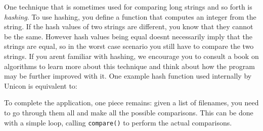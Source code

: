 
One technique that is sometimes used for comparing long strings and so
forth is \textit{hashing}. To use hashing, you define a
function that computes an integer from the string. If the hash values
of two strings are different, you know that they cannot be the same.
However hash values being equal doesn{\textquotesingle}t necessarily
imply that the strings are equal, so in the worst case scenario you
still have to compare the two strings. If you aren{\textquotesingle}t
familiar with hashing, we encourage you to consult a book on algorithms
to learn more about this technique and think about how the program may
be further improved with it. One example hash function used internally
by Unicon is equivalent to:


To complete the application, one piece remains: given a list of
filenames, you need to go through them all and make all the possible
comparisons. This can be done with a simple loop, calling
\texttt{compare()} to perform the actual comparisons. 


